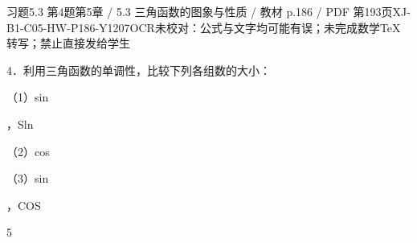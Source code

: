 \begin{bankitem}{习题5.3 第4题}{第5章 / 5.3 三角函数的图象与性质 / 教材 p.186 / PDF 第193页}{XJ-B1-C05-HW-P186-Y1207}{OCR未校对：公式与文字均可能有误；未完成数学TeX转写；禁止直接发给学生}
\begin{ocrdraft}
\par
4．利用三角函数的单调性，比较下列各组数的大小：
\par
（1）sin
\par
，Sln
\par
（2）cos
\par
（3）sin
\par
，COS
\par
5
\end{ocrdraft}
\end{bankitem}
